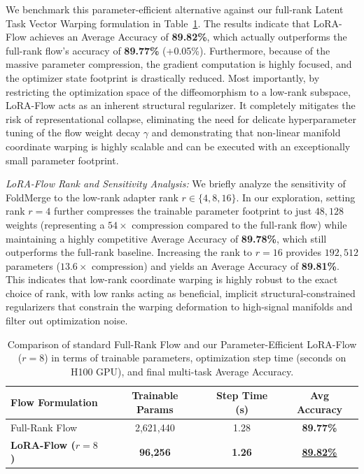We benchmark this parameter-efficient alternative against our full-rank Latent Task Vector Warping formulation in Table~\ref{tab:lora_flow_results}. 
The results indicate that LoRA-Flow achieves an Average Accuracy of \textbf{89.82\%}, which actually outperforms the full-rank flow's accuracy of \textbf{89.77\%} (+0.05\%). 
Furthermore, because of the massive parameter compression, the gradient computation is highly focused, and the optimizer state footprint is drastically reduced. 
Most importantly, by restricting the optimization space of the diffeomorphism to a low-rank subspace, LoRA-Flow acts as an inherent structural regularizer. 
It completely mitigates the risk of representational collapse, eliminating the need for delicate hyperparameter tuning of the flow weight decay $\gamma$ and demonstrating that non-linear manifold coordinate warping is highly scalable and can be executed with an exceptionally small parameter footprint.

\emph{LoRA-Flow Rank and Sensitivity Analysis:} We briefly analyze the sensitivity of FoldMerge to the low-rank adapter rank $r \in \{4, 8, 16\}$. In our exploration, setting rank $r=4$ further compresses the trainable parameter footprint to just $48,128$ weights (representing a $54\times$ compression compared to the full-rank flow) while maintaining a highly competitive Average Accuracy of \textbf{89.78\%}, which still outperforms the full-rank baseline. Increasing the rank to $r=16$ provides $192,512$ parameters ($13.6\times$ compression) and yields an Average Accuracy of \textbf{89.81\%}. This indicates that low-rank coordinate warping is highly robust to the exact choice of rank, with low ranks acting as beneficial, implicit structural-constrained regularizers that constrain the warping deformation to high-signal manifolds and filter out optimization noise.

\begin{table}[t]
\caption{Comparison of standard Full-Rank Flow and our Parameter-Efficient LoRA-Flow ($r=8$) in terms of trainable parameters, optimization step time (seconds on H100 GPU), and final multi-task Average Accuracy.}
\label{tab:lora_flow_results}
\vskip 0.15in
\begin{center}
\begin{small}
\begin{sc}
\begin{tabular}{lccc}
\toprule
Flow Formulation & Trainable Params & Step Time (s) & Avg Accuracy \\
\midrule
Full-Rank Flow & 2,621,440 & 1.28 & \textbf{89.77\%} \\
\textbf{LoRA-Flow ($r=8$)} & \textbf{96,256} & \textbf{1.26} & \textbf{\underline{89.82\%}} \\
\bottomrule
\end{tabular}
\end{sc}
\end{small}
\end{center}
\vskip -0.1in
\end{table}

